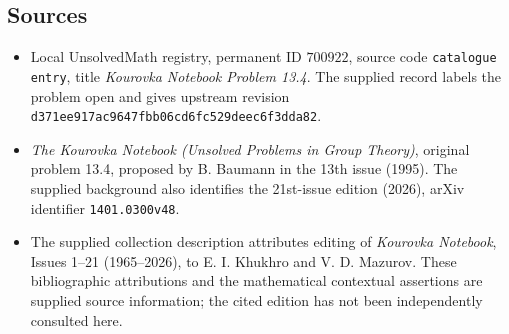 \documentclass[11pt]{article}
\begin{document}
\subsection{Sources}
\begin{itemize}
\item Local UnsolvedMath registry, permanent ID \(700922\), source code \texttt{catalogue entry}, title \emph{Kourovka Notebook Problem 13.4}. The supplied record labels the problem open and gives upstream revision \texttt{d371ee917ac9647fbb06cd6fc529deec6f3dda82}.
\item \emph{The Kourovka Notebook (Unsolved Problems in Group Theory)}, original problem 13.4, proposed by B. Baumann in the 13th issue (1995). The supplied background also identifies the 21st-issue edition (2026), arXiv identifier \texttt{1401.0300v48}.
\item The supplied collection description attributes editing of \emph{Kourovka Notebook}, Issues 1--21 (1965--2026), to E. I. Khukhro and V. D. Mazurov. These bibliographic attributions and the mathematical contextual assertions are supplied source information; the cited edition has not been independently consulted here.
\end{itemize}
\end{document}
